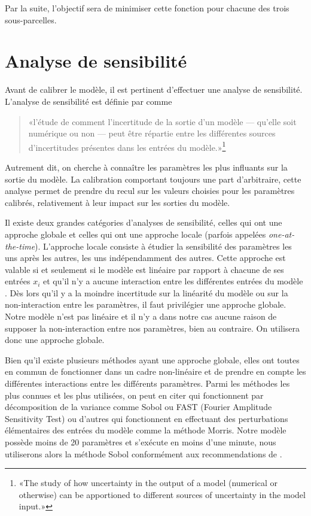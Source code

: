 Par la suite, l'objectif sera de minimiser cette fonction pour chacune des trois sous-parcelles.

\section{Analyse de sensibilité}

Avant de calibrer le modèle, il est pertinent d'effectuer une analyse de sensibilité.
L'analyse de sensibilité est définie par \citet{saltelli2004} comme
\begin{quote}
 «l'étude de comment l'incertitude de la sortie d'un modèle --- qu'elle soit numérique ou non --- peut être répartie entre les différentes sources d'incertitudes présentes dans les entrées du modèle.»\footnote{«The study of how uncertainty in the output of a model (numerical or otherwise) can be apportioned to different sources of uncertainty in the model input.»}
\end{quote}
Autrement dit, on cherche à connaître les paramètres les plus influants sur la sortie du modèle.
La calibration comportant toujours une part d'arbitraire, cette analyse permet de prendre du recul sur les valeurs choisies pour les paramètres calibrés, relativement à leur impact sur les sorties du modèle.

Il existe deux grandes catégories d'analyses de sensibilité, celles qui ont une approche globale et celles qui ont une approche locale (parfois appelées \emph{one-at-the-time}).
L'approche locale consiste à étudier la sensibilité des paramètres les uns après les autres, les uns indépendamment des autres.
Cette approche est valable si et seulement si le modèle est linéaire par rapport à chacune de ses entrées $x_i$ et qu'il n'y a aucune interaction entre les différentes entrées du modèle \citep{saltelli2019so}.
Dès lors qu'il y a la moindre incertitude sur la linéarité du modèle ou sur la non-interaction entre les paramètres, il faut privilégier une approche globale.
Notre modèle n'est pas linéaire et il n'y a dans notre cas aucune raison de supposer la non-interaction entre nos paramètres, bien au contraire.
On utilisera donc une approche globale.

Bien qu'il existe plusieurs méthodes ayant une approche globale, elles ont toutes en commun de fonctionner dans un cadre non-linéaire et de prendre en compte les différentes interactions entre les différents paramètres.
Parmi les méthodes les plus connues et les plus utilisées, on peut en citer qui fonctionnent par décomposition de la variance comme Sobol ou FAST (Fourier Amplitude Sensitivity Test) ou d'autres qui fonctionnent en effectuant des perturbations élémentaires des entrées du modèle comme la méthode Morris.
Notre modèle possède moins de 20 paramètres et s'exécute en moins d'une minute, nous utiliserons alors la méthode Sobol conformément aux recommendations de \citet[chap. 6]{saltelli}.


